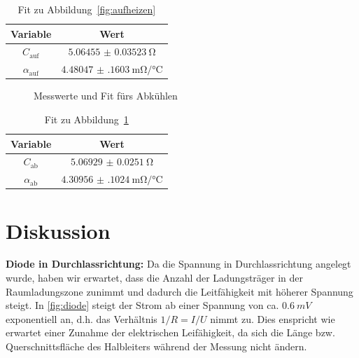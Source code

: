 \begin{table}[H]
  \centering
  \begin{tabular}{c | c}
    Variable & Wert \\ \hline
    $C_{\text{auf}}$ & $\SI{5.06455(3523)}{\ohm}$ \\
    $\alpha_{\text{auf}}$ & $\SI{4.48047(16030)}{\milli\ohm\per\degreeCelsius}$ \\
  \end{tabular}
  \caption{Fit zu Abbildung~\ref{fig:aufheizen}}
  \label{tab:fitaufheizen}
\end{table}
\begin{figure}[H]
\centering
{}
\caption{Messwerte und Fit fürs Abkühlen}
\label{fig:abkuehlen}
\end{figure}
\begin{table}[H]
  \centering
  \begin{tabular}{c | c}
    Variable & Wert \\ \hline
    $C_{\text{ab}}$ & $\SI{5.06929(2510)}{\ohm}$ \\
    $\alpha_{\text{ab}}$ & $\SI{4.30956(10240)}{\milli\ohm\per\degreeCelsius}$ \\
  \end{tabular}
  \caption{Fit zu Abbildung~\ref{fig:abkuehlen}}
  \label{tab:fitabkuehlen}
\end{table}
\section{Diskussion}
\textbf{Diode in Durchlassrichtung:} Da die Spannung in Durchlassrichtung angelegt wurde, haben wir erwartet, dass die Anzahl der Ladungsträger in der Raumladungszone zunimmt und dadurch die Leitfähigkeit mit höherer Spannung steigt. In \cref{fig:diode} steigt der Strom ab einer Spannung von ca. $\SI{0.6}{mV}$ exponentiell an, d.h. das Verhältnis $1/R=I/U$ nimmt zu. Dies enspricht wie erwartet einer Zunahme der elektrischen Leifähigkeit, da sich die Länge bzw. Querschnittsfläche des Halbleiters während der Messung nicht ändern.

